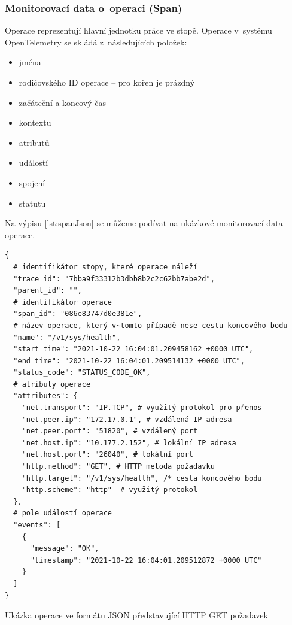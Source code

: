   \subsubsection{Monitorovací data o~operaci (Span) }
  Operace reprezentují hlavní jednotku práce ve stopě. Operace v~systému OpenTelemetry se skládá z~následujících položek:
  \begin{itemize}
  \item{jména}
  \item{rodičovského ID operace – pro kořen je prázdný}
  \item{začáteční a koncový čas}
  \item{kontextu}
  \item{atributů}
  \item{událostí}
  \item{spojení}
  \item{statutu}
\end{itemize}
Na výpisu \ref{lst:spanJson} se můžeme podívat na ukázkové monitorovací data operace.

\begin{listing}[H]
    \begin{verbatim}
{
  # identifikátor stopy, které operace náleží 
  "trace_id": "7bba9f33312b3dbb8b2c2c62bb7abe2d",
  "parent_id": "",
  # identifikátor operace 
  "span_id": "086e83747d0e381e",
  # název operace, který v~tomto případě nese cestu koncového bodu 
  "name": "/v1/sys/health",
  "start_time": "2021-10-22 16:04:01.209458162 +0000 UTC",
  "end_time": "2021-10-22 16:04:01.209514132 +0000 UTC",
  "status_code": "STATUS_CODE_OK",
  # atributy operace 
  "attributes": {
    "net.transport": "IP.TCP", # využitý protokol pro přenos 
    "net.peer.ip": "172.17.0.1", # vzdálená IP adresa 
    "net.peer.port": "51820", # vzdálený port 
    "net.host.ip": "10.177.2.152", # lokální IP adresa 
    "net.host.port": "26040", # lokální port 
    "http.method": "GET", # HTTP metoda požadavku 
    "http.target": "/v1/sys/health", /* cesta koncového bodu 
    "http.scheme": "http"  # využitý protokol 
  },
  # pole událostí operace 
  "events": [
    {
      "message": "OK",
      "timestamp": "2021-10-22 16:04:01.209512872 +0000 UTC"
    }
  ]
}
\end{verbatim}
    \caption{Ukázka operace ve formátu JSON představující HTTP GET požadavek}
    \label{lst:spanJson}
\end{listing}


